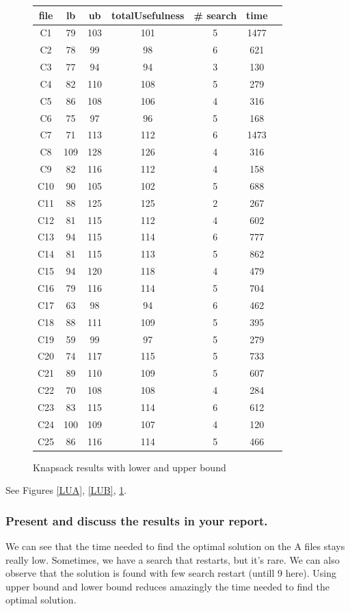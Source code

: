 \documentclass[a4paper ,12pt,french]{article}
\begin{document}
\begin{figure}[!h]
\begin{tabular}{|c|c|c|c|c|c|c|}
\hline
file&lb&ub&totalUsefulness&\# search&time\\
\hline
\hline

C1&79&103&101&5&1477\\\hline
C2&78&99&98&6&621\\\hline
C3&77&94&94&3&130\\\hline
C4&82&110&108&5&279\\\hline
C5&86&108&106&4&316\\\hline
C6&75&97&96&5&168\\\hline
C7&71&113&112&6&1473\\\hline
C8&109&128&126&4&316\\\hline
C9&82&116&112&4&158\\\hline
C10&90&105&102&5&688\\\hline
C11&88&125&125&2&267\\\hline
C12&81&115&112&4&602\\\hline
C13&94&115&114&6&777\\\hline
C14&81&115&113&5&862\\\hline
C15&94&120&118&4&479\\\hline
C16&79&116&114&5&704\\\hline
C17&63&98&94&6&462\\\hline
C18&88&111&109&5&395\\\hline
C19&59&99&97&5&279\\\hline
C20&74&117&115&5&733\\\hline
C21&89&110&109&5&607\\\hline
C22&70&108&108&4&284\\\hline
C23&83&115&114&6&612\\\hline
C24&100&109&107&4&120\\\hline
C25&86&116&114&5&466\\\hline

\end{tabular}
\caption{Knapsack results with lower and upper bound}
\label{LUC}
\end{figure}


See Figures \ref{LUA}, \ref{LUB}, \ref{LUC}.

\subsubsection{Present and discuss the results in your report.}


We can see that the time needed to find the optimal solution on the A files stays really low. Sometimes, we have a search that restarts, but it's rare.
We can also observe that the solution is found with few search restart (untill 9 here). Using upper bound and lower bound reduces amazingly the time needed to find the optimal solution. 
\end{document}
